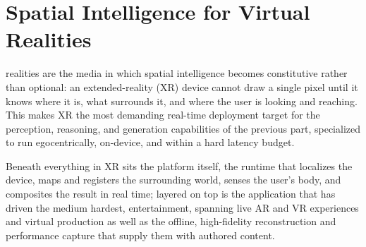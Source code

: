 \chapter{Spatial Intelligence for Virtual Realities}

 realities are the media in which spatial intelligence becomes constitutive rather than optional: an extended-reality (XR) device cannot draw a single pixel until it knows where it is, what surrounds it, and where the user is looking and reaching. This makes XR the most demanding real-time deployment target for the perception, reasoning, and generation capabilities of the previous part, specialized to run egocentrically, on-device, and within a hard latency budget.

Beneath everything in XR sits the platform itself, the runtime that localizes the device, maps and registers the surrounding world, senses the user's body, and composites the result in real time; layered on top is the application that has driven the medium hardest, entertainment, spanning live AR and VR experiences and virtual production as well as the offline, high-fidelity reconstruction and performance capture that supply them with authored content.



\newpage
